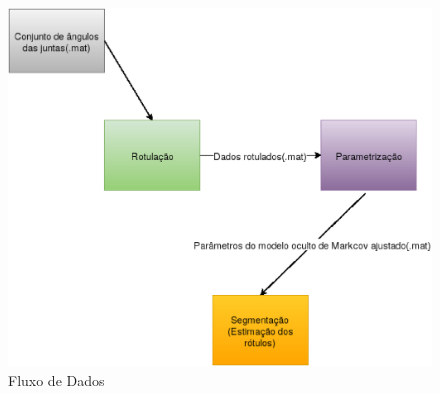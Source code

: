 \begin{figure}[!h]
\centering
\includegraphics [keepaspectratio=true,scale=0.60]{figuras/diagramProt.eps}
\caption{Fluxo de Dados}
\label{diagramProt}

\end{figure}


